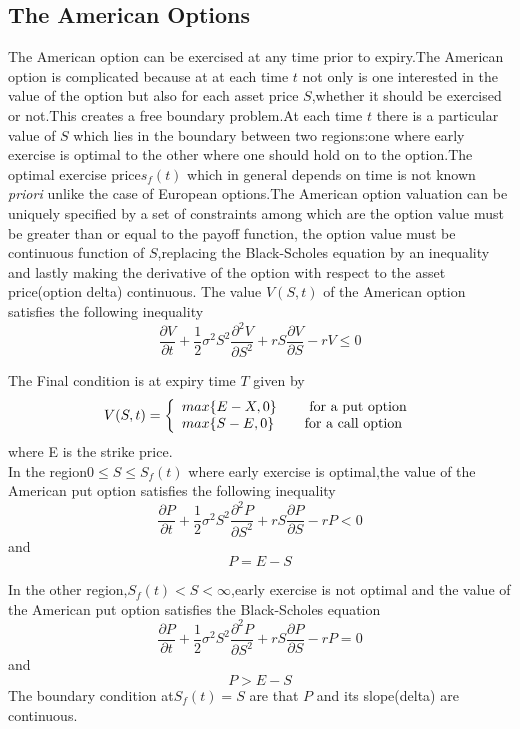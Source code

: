 \documentclass[12pt]{article}
\numberwithin{equation}{section} %
\begin{document}
\subsection{The American Options}
The American option can be exercised at any time prior to expiry.The
American option is complicated because at at each time $t$ not only
is one interested in the value of the option but also for each asset
price $S$,whether it should be exercised or not.This creates a free
boundary problem\cite{Wilmot}.At each time $t$ there is a particular
value of $S$ which lies in the boundary between two regions:one
where early exercise is optimal to the other where one should hold
on to the option.The optimal exercise price$s_{f}(t)$ which in
general depends on time is not known \textit{priori} unlike the case
of European options.The American option valuation can be uniquely
specified by a set of constraints among which are the option value
must be greater than or equal to the payoff function, the option
value must be continuous function of $S$,replacing the Black-Scholes
equation by an inequality and lastly making the derivative of the
option with respect to the asset price(option delta) continuous.
 The value $V(S,t)$ of the American option satisfies the following
 inequality
 \begin{equation}
\frac{\partial V}{\partial t}+\frac{1}{2}\sigma^2S^2\frac{\partial^2
V}{\partial S^2} +rS\frac{\partial V}{\partial S}-rV\leq 0
 \end{equation}

The Final condition is at expiry time $T$ given by\cite{Wilmot}
\[V(S,t) = \left\{
\begin{array}{l l}\label{FNC}
  max\{E-X,0\} & \quad \mbox{ for a put option}\\
  max\{S-E,0\}& \quad \mbox{for a call option}\\ \end{array} \right. \]
  where E is the strike price.\\
  In the region$0\leq S\leq S_{f}(t)$ where early exercise is optimal,the value of the
  American put option satisfies the following inequality
 \begin{equation}
\frac{\partial P}{\partial t}+\frac{1}{2}\sigma^2S^2\frac{\partial^2
P}{\partial S^2} +rS\frac{\partial P}{\partial S}-rP< 0
 \end{equation}
 and
  \begin{equation}
P=E-S
 \end{equation}

In the other region,$S_{f}(t)< S<\infty$,early exercise is not
optimal and the value of the American put option satisfies the
Black-Scholes equation
 \begin{equation}
\frac{\partial P}{\partial t}+\frac{1}{2}\sigma^2S^2\frac{\partial^2
P}{\partial S^2} +rS\frac{\partial P}{\partial S}-rP= 0
 \end{equation}
 and
  \begin{equation}
P>E-S
 \end{equation}
 The boundary condition at$S_{f}(t)= S$ are that $P$ and its
 slope(delta) are continuous.
\end{document}
